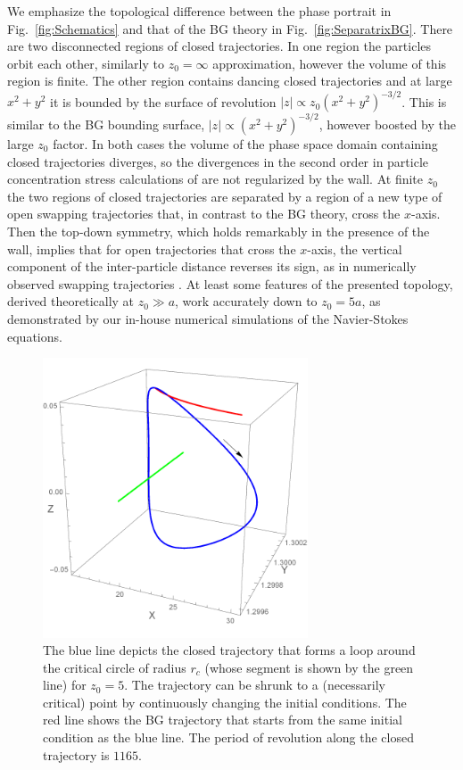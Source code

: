 We emphasize the topological difference between the phase portrait in Fig.~\ref{fig:Schematics} and that of the BG theory in Fig.~\ref{fig:SeparatrixBG}. There are two disconnected regions of closed trajectories. In one region the particles orbit each other, similarly to $z_0=\infty$ approximation, however the volume of this region is finite. The other region contains dancing closed trajectories and at large $x^2+y^2$ it is bounded by the surface of revolution $|z|\propto z_0(x^2+y^2)^{-3/2}$. This is similar to the BG bounding surface, $|z|\propto (x^2+y^2)^{-3/2}$, however boosted by the large $z_0$ factor. In both cases the volume of the phase space domain containing closed trajectories diverges, so the divergences in the second order in particle concentration stress calculations of \cite{batchelor_green_1972b} are not regularized by the wall. At finite $z_0$ the two regions of closed trajectories are separated by a region of a new type of open swapping trajectories that, in contrast to the BG theory, cross the $x$-axis. Then the top-down symmetry, which holds remarkably in the presence of the wall, implies that for open trajectories that cross the $x$-axis, the vertical component of the inter-particle distance reverses its sign, as in numerically observed swapping trajectories \cite{zurita-gotor_2007}. At least some features of the presented topology, derived theoretically at $z_0\gg a$, work accurately down to $z_0=5a$, as demonstrated by our in-house numerical simulations of the Navier-Stokes equations.
%
\begin{figure}[t]
 \centering
\includegraphics[width=0.7\textwidth]{Fig8b_CircleRc.pdf}
\caption{The blue line depicts the closed trajectory that forms a loop around the critical circle of radius $r_c$ (whose segment is shown by the green line) for $z_0=5$.
The trajectory can be shrunk to a (necessarily critical) point by continuously changing the initial conditions. The red line shows the BG trajectory
that starts from the same initial condition as the blue line. The period of revolution along the closed trajectory is $1165$.}
\label{Fig8b_CircleRc}
\end{figure}
